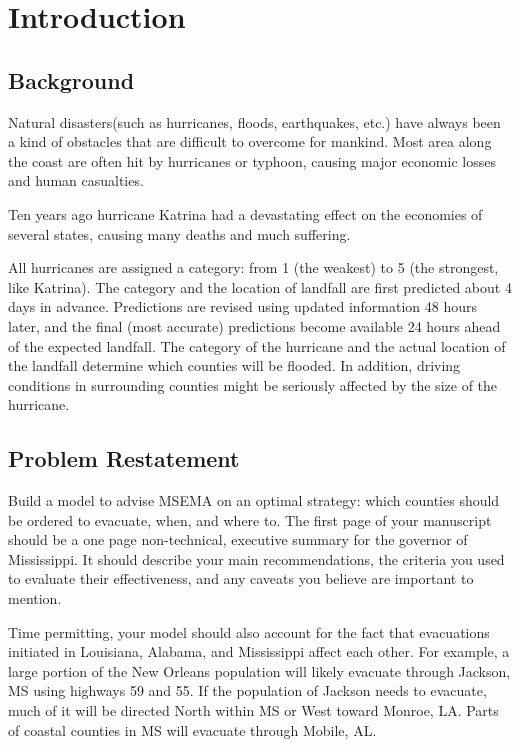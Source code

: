 \documentclass{mcmthesis}
\begin{document}
\newpage

\pagestyle{fancy}

\setcounter{page}{1}
\section{Introduction}
\subsection{Background}

Natural disasters(such as hurricanes, floods, earthquakes, etc.) have always been a kind of obstacles that are difficult to overcome for mankind. Most area along the coast are often hit by hurricanes or typhoon, causing major economic losses and human casualties.

Ten years ago hurricane Katrina had a devastating effect on the economies of several states, causing many deaths and much suffering.

All hurricanes are assigned a category: from 1 (the weakest) to 5 (the strongest, like Katrina). The category and the location of landfall are first predicted about 4 days in advance. Predictions are revised using updated information 48 hours later, and the final (most accurate) predictions become available 24 hours ahead of the expected landfall. The category of the hurricane and the actual location of the landfall determine which counties will be flooded. In addition, driving conditions in surrounding counties might be seriously affected by the size of the hurricane.

\subsection{Problem Restatement}

Build a model to advise MSEMA on an optimal strategy: which counties should be ordered to evacuate, when, and where to. The first page of your manuscript should be a one page non-technical, executive summary for the governor of Mississippi. It should describe your main recommendations, the criteria you used to evaluate their effectiveness, and any caveats you believe are important to mention.

Time permitting, your model should also account for the fact that evacuations initiated in Louisiana, Alabama, and Mississippi affect each other. For example, a large portion of the New Orleans population will likely evacuate through Jackson, MS using highways 59 and 55. If the population of Jackson needs to evacuate, much of it will be directed North within MS or West toward Monroe, LA. Parts of coastal counties in MS will evacuate through Mobile, AL.
\end{document}
